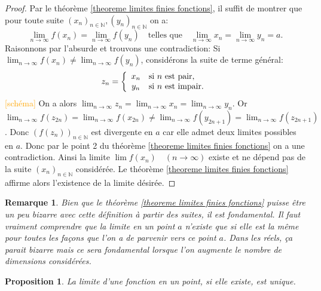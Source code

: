 \documentclass[a4paper, 12pt, french, twoside]{article}
\newtheorem{proposition}[theorem]{Proposition}
\newtheorem{rem}[theorem]{Remarque}
\newcommand{\Nn}{{\mathbb{N}}}
\newcommand{\later}[1]{\textcolor{orange}{[#1]}}
\begin{document}
\begin{proof}
    

Par le théorème \ref{theoreme limites finies fonctions}, il suffit de montrer que pour toute suite $(x_n)_{n\in\Nn}, (y_n)_{n\in\Nn}$ on a:
\[
\lim_{n\rightarrow\infty}f(x_n)=\lim_{n\rightarrow\infty}f(y_n) \quad \text{telles que}\quad \lim_{n\rightarrow \infty}x_n=\lim_{n\rightarrow \infty}y_n=a.
\]
Raisonnons par l'absurde et trouvons une contradiction: Si $\lim_{n\rightarrow\infty}f(x_n)\neq\lim_{n\rightarrow\infty}f(y_n)$, considérons la suite de terme général:
\[z_n=
     \left \{
   \begin{array}{c l}
      x_n & \text{si $n$ est pair,}\\
      y_n &\text{si $n$ est impair}. 
   \end{array}
   \right .\]
\later{schéma}
On a alors $\lim_{n\rightarrow\infty}z_n=\lim_{n\rightarrow\infty}x_n=\lim_{n\rightarrow\infty}y_n$. Or $\lim_{n\rightarrow\infty}f(z_{2n})=\lim_{n\rightarrow\infty}f(x_{2n})\neq\lim_{n\rightarrow\infty}f(y_{2n+1})=\lim_{n\rightarrow\infty}f(z_{2n+1})$. Donc $(f(z_n))_{n\in\Nn}$ est divergente en $a$ car elle admet deux limites possibles en $a$. Donc par le point 2 du théorème \ref{theoreme limites finies fonctions} on a une contradiction. Ainsi la limite $\lim f(x_n)\quad(n\rightarrow\infty)$ existe et ne dépend pas de la suite $(x_n)_{n\in\Nn}$ considérée. Le théorème \ref{theoreme limites finies fonctions} affirme alors l'existence de la limite désirée.
\end{proof}
 \begin{rem}
     Bien que le théorème \ref{theoreme limites finies fonctions} puisse être un peu bizarre avec cette définition à partir des suites, il est fondamental.  Il faut vraiment comprendre que la limite en un point $a$ n'existe que si elle est la même pour toutes les façons que l'on a de parvenir vers ce point $a$. Dans les réels, ça parait bizarre mais ce sera fondamental lorsque l'on augmente le nombre de dimensions considérées.
 \end{rem}
\begin{proposition}
    La limite d'une fonction en un point, si elle existe, est unique.
\end{proposition}
\end{document}
